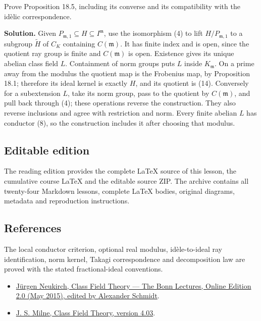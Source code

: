 \documentclass[11pt,a4paper]{article}
\newcommand{\tightlist}{\setlength{\itemsep}{0pt}\setlength{\parskip}{0pt}}
\begin{document}
Prove Proposition 18.5, including its converse and its compatibility
with the idèlic correspondence.

\textbf{Solution.} Given
\(P_{\mathfrak m,1}\subseteq H\subseteq I^{\mathfrak m}\), use the
isomorphism (4) to lift \(H/P_{\mathfrak m,1}\) to a subgroup
\(\widetilde H\) of \(C_K\) containing \(C(\mathfrak m)\). It has finite
index and is open, since the quotient ray group is finite and
\(C(\mathfrak m)\) is open. Existence gives its unique abelian class
field \(L\). Containment of norm groups puts \(L\) inside
\(K_{\mathfrak m}\). On a prime away from the modulus the quotient map
is the Frobenius map, by Proposition 18.1; therefore its ideal kernel is
exactly \(H\), and its quotient is (14). Conversely for a subextension
\(L\), take its norm group, pass to the quotient by \(C(\mathfrak m)\),
and pull back through (4); these operations reverse the construction.
They also reverse inclusions and agree with restriction and norm. Every
finite abelian \(L\) has conductor (8), so the construction includes it
after choosing that modulus.

\subsection{Editable edition}\label{editable-edition}

The reading edition provides the complete LaTeX source of this lesson,
the cumulative course LaTeX and the editable source ZIP. The archive
contains all twenty-four Markdown lessons, complete LaTeX bodies,
original diagrams, metadata and reproduction instructions.

\subsection{References}\label{references}

The local conductor criterion, optional real modulus, idèle-to-ideal ray
identification, norm kernel, Takagi correspondence and decomposition law
are proved with the stated fractional-ideal conventions.

\begin{itemize}
\tightlist
\item
  \href{https://www.mathi.uni-heidelberg.de/~schmidt/Neukirch-en/Neukirch_cft_02_may15.pdf}{Jürgen
  Neukirch, Class Field Theory --- The Bonn Lectures, Online Edition 2.0
  (May 2015), edited by Alexander Schmidt}.
\item
  \href{https://www.jmilne.org/math/CourseNotes/CFT.pdf}{J. S. Milne,
  Class Field Theory, version 4.03}.
\end{itemize}
\end{document}
